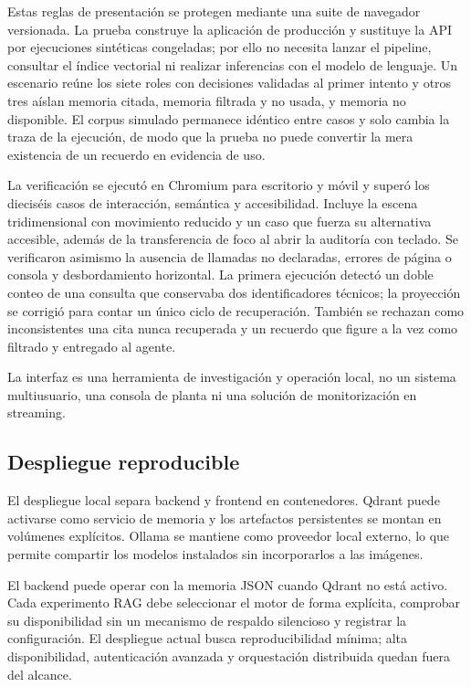 Estas reglas de presentación se protegen mediante una suite de navegador
versionada. La prueba construye la aplicación de producción y sustituye la API
por ejecuciones sintéticas congeladas; por ello no necesita lanzar el
pipeline, consultar el índice vectorial ni realizar inferencias con el modelo
de lenguaje. Un escenario reúne los siete roles con decisiones validadas al
primer intento y otros tres aíslan memoria citada, memoria filtrada y no usada,
y memoria no disponible. El corpus simulado permanece idéntico entre casos y
solo cambia la traza de la ejecución, de modo que la prueba no puede convertir
la mera existencia de un recuerdo en evidencia de uso.

La verificación se ejecutó en Chromium para escritorio y móvil y superó los
dieciséis casos de interacción, semántica y accesibilidad. Incluye la escena
tridimensional con movimiento reducido y un caso que fuerza su alternativa
accesible, además de la transferencia de foco al abrir la auditoría con
teclado. Se verificaron asimismo la ausencia de llamadas no declaradas,
errores de página o consola y desbordamiento horizontal. La primera ejecución
detectó un doble conteo de una consulta que conservaba dos identificadores
técnicos; la proyección se corrigió para contar un único ciclo de recuperación.
También se rechazan como inconsistentes una cita nunca recuperada y un recuerdo
que figure a la vez como filtrado y entregado al agente.

La interfaz es una herramienta de investigación y operación local, no un
sistema multiusuario, una consola de planta ni una solución de monitorización
en streaming.

\subsection{Despliegue reproducible}

El despliegue local separa backend y frontend en contenedores. Qdrant puede
activarse como servicio de memoria y los artefactos persistentes se montan en
volúmenes explícitos. Ollama se mantiene como proveedor local externo, lo que
permite compartir los modelos instalados sin incorporarlos a las imágenes.

El backend puede operar con la memoria JSON cuando Qdrant no está activo. Cada
experimento RAG debe seleccionar el motor de forma explícita, comprobar su
disponibilidad sin un mecanismo de respaldo silencioso y registrar la configuración. El
despliegue actual busca reproducibilidad mínima; alta disponibilidad,
autenticación avanzada y orquestación distribuida quedan fuera del alcance.

